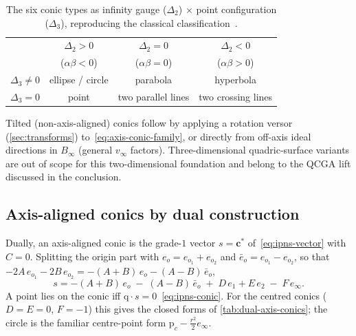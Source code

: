 \documentclass{birkjour}
\theoremstyle{definition}
\theoremstyle{remark}
\newcommand{\einf}{e_\infty}
\newcommand{\eobar}{\bar e_o}
\begin{document}
\begin{table}[H]
\centering
\caption{The six conic types as infinity gauge ($\Delta_2$) $\times$ point
configuration ($\Delta_3$), reproducing the classical
classification~\cite{richter-gebert_perspectives_2011}.}
\label{tab:axis-master}
\begin{tabular}{@{}lccc@{}}
\toprule
 & $\Delta_2>0$ & $\Delta_2=0$ & $\Delta_2<0$ \\
 & ($\alpha\beta<0$) & ($\alpha\beta=0$) & ($\alpha\beta>0$) \\
\midrule
$\Delta_3\neq0$ & ellipse / circle & parabola          & hyperbola \\
$\Delta_3=0$    & point            & two parallel lines & two crossing lines \\
\bottomrule
\end{tabular}
\end{table}

Tilted (non-axis-aligned) conics follow by applying a rotation versor
(\cref{sec:transforms}) to~\eqref{eq:axis-conic-family}, or directly from off-axis
ideal directions in $B_\infty$ (general $v_\infty$ factors). Three-dimensional
quadric-surface variants are out of scope for this two-dimensional foundation and
belong to the QCGA lift discussed in the conclusion.

\subsection{Axis-aligned conics by dual construction}
\label{sec:axis-aligned-dual}
Dually, an axis-aligned conic is the grade-$1$ vector $s=\mathbf{c}^{*}$
of~\eqref{eq:ipns-vector} with $C=0$. Splitting the origin part with $e_o=e_{o_1}+e_{o_2}$
and $\eobar=e_{o_1}-e_{o_2}$, so that $-2A\,e_{o_1}-2B\,e_{o_2}=-(A{+}B)\,e_o-(A{-}B)\,\eobar$,
\begin{equation}\label{eq:dual-axis-conic}
  s = -(A{+}B)\,e_o \;-\;(A{-}B)\,\eobar \;+\; D\,e_1 + E\,e_2 \;-\; F\,\einf .
\end{equation}
A point lies on the conic iff $\mathrm{q}\cdot s = 0$~\eqref{eq:ipns-conic}. For the
centred conics ($D=E=0$, $F=-1$) this gives the closed forms of \cref{tab:dual-axis-conics};
the circle is the familiar centre-point form $\mathrm{p}_c-\tfrac{r^2}{2}\einf$.
\end{document}
